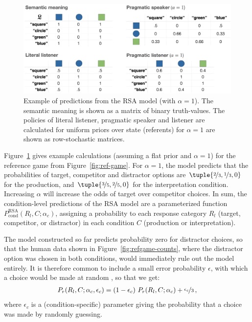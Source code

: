 \documentclass[fleqn]{article}
\begin{document}
\begin{figure}[t]
  \centering
  \includegraphics[width = 0.9 \textwidth]{00-pics/RSA-example.png}
  \caption{
    Example of predictions from the RSA model (with $\alpha=1$).
    The semantic meaning is shown as a matrix of binary truth-values.
    The policies of literal listener, pragmatic speaker and listener are calculated for uniform priors over state (referents) for $\alpha=1$ are shown as row-stochastic matrices.
  }
  \label{fig:RSA-example}
\end{figure}

Figure~\ref{fig:RSA-example} gives example calculations (assuming a flat prior and $\alpha=1$) for the reference game from Figure~\ref{fig:ref-game}.
For $\alpha=1$, the model predicts that the probabilities of target, competitor and distractor options are $\tuple{\nicefrac{2}{3}, \nicefrac{1}{3}, 0}$ for the production, and $\tuple{\nicefrac{3}{5}, \nicefrac{2}{5}, 0}$ for the interpretation condition.
Increasing $\alpha$ will increase the odds of target over competitor choices.
In sum, the condition-level predictions of the RSA model are a parameterized function $P_{\text{cond}}^{\text{RSA}}(R_{l}, C; \alpha_{c})$, assigning a probability to each response category $R_{l}$ (target, competitor, or distractor) in each condition $C$ (production or interpretation).

The model constructed so far predicts probability zero for distractor choices, so that the human data shown in Figure~\ref{fig:refgame-counts}, where the distractor option was chosen in both conditions, would immediately rule out the model entirely.
It is therefore common to include a small error probability $\epsilon$, with which a choice would be made at random \citep[e.g.,][]{LeeWagenmakers2013:Bayesian-Cognit}, so that we get:
%
\begin{align*}
  P_{r}(R_{l}, C; \alpha_{c}, \epsilon_{c}) = (1 - \epsilon_{c}) \  P_{r}(R_{l}, C; \alpha_{c}) +  \nicefrac{\epsilon_{c}}{3}\,,
\end{align*}
%
where $\epsilon_{c}$ is a (condition-specific) parameter giving the probability that a choice was made by randomly guessing.
\end{document}

